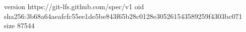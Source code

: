 version https://git-lfs.github.com/spec/v1
oid sha256:3b68a64aeafcfc55ee1de5be843f65b28c0128e305261543589259f4303bc071
size 87544

